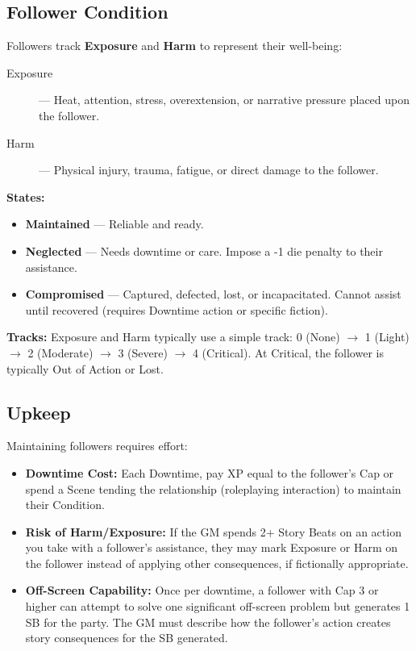 \subsection*{Follower Condition}

Followers track \textbf{Exposure} and \textbf{Harm} to represent their well-being:

\begin{description}
  \item[Exposure]  — Heat, attention, stress, overextension, or narrative pressure placed upon the follower.
  \item[Harm]  — Physical injury, trauma, fatigue, or direct damage to the follower.
\end{description}

\textbf{States:}
\begin{itemize}
  \item \textbf{Maintained}  — Reliable and ready.
  \item \textbf{Neglected}  — Needs downtime or care. Impose a -1 die penalty to their assistance.
  \item \textbf{Compromised}  — Captured, defected, lost, or incapacitated. Cannot assist until recovered (requires Downtime action or specific fiction).
\end{itemize}

\textbf{Tracks:} Exposure and Harm typically use a simple track: 0 (None) $\rightarrow$ 1 (Light) $\rightarrow$ 2 (Moderate) $\rightarrow$ 3 (Severe) $\rightarrow$ 4 (Critical). At Critical, the follower is typically Out of Action or Lost.

\subsection*{Upkeep}

Maintaining followers requires effort:

\begin{itemize}
  \item \textbf{Downtime Cost:} Each Downtime, pay XP equal to the follower's Cap or spend a Scene tending the relationship (roleplaying interaction) to maintain their Condition.
  \item \textbf{Risk of Harm/Exposure:} If the GM spends 2+ Story Beats  on an action you take with a follower's assistance, they may mark Exposure or Harm on the follower instead of applying other consequences, if fictionally appropriate.
  \item \textbf{Off-Screen Capability:} Once per downtime, a follower with Cap 3 or higher can attempt to solve one significant off-screen problem but generates 1 SB for the party. The GM must describe how the follower's action creates story consequences for the SB generated.
\end{itemize}

